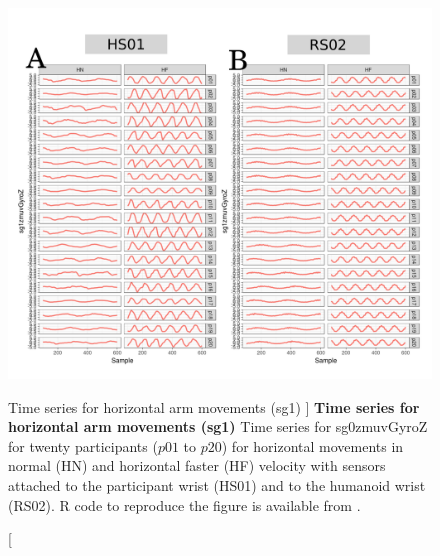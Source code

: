 \begin{figure}
\centering
\includegraphics[width=1.0\textwidth]{aH-sg1}
    	\caption
	[Time series for horizontal arm movements (sg1) ]{
	{\bf Time series for horizontal arm movements (sg1)}
		Time series for sg0zmuvGyroZ for twenty participants 
		($p01$ to  $p20$) 
		for horizontal movements in normal (HN) and horizontal faster (HF) 
		velocity with sensors attached to the participant wrist (HS01)
		and to the humanoid wrist (RS02).
	R code to reproduce the figure is available from \cite{hwum2018}.
        }
    \label{fig:aH-sg1}
\end{figure}

